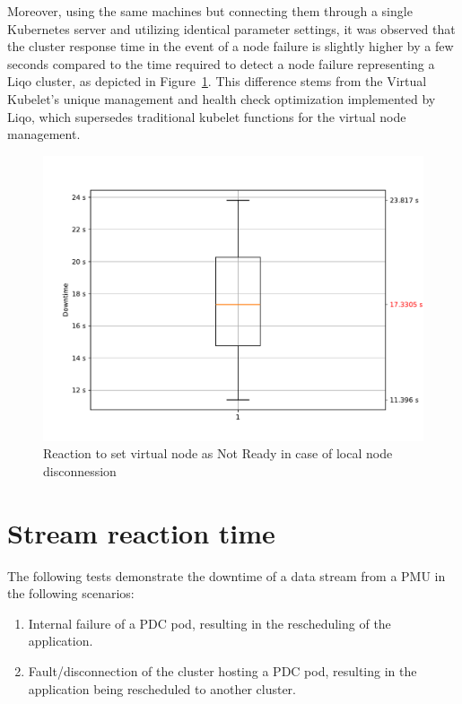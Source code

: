 Moreover, using the same machines but connecting them through a single Kubernetes server and utilizing identical parameter settings, it was observed that the cluster response time in the event of a node failure is slightly higher by a few seconds compared to the time required to detect a node failure representing a Liqo cluster, as depicted in Figure~\ref{graph:k-reaction2}. This difference stems from the Virtual Kubelet's unique management and health check optimization implemented by Liqo, which supersedes traditional kubelet functions for the virtual node management.

\begin{figure}[ht]\centering
\includegraphics[scale=0.4]{Pictures/k3s-reaction2}
\caption{Reaction to set virtual node as Not Ready in case of local node disconnession}\label{graph:k-reaction2}
\end{figure}

\section{Stream reaction time}
The following tests demonstrate the downtime of a data stream from a PMU in the following scenarios:

\begin{enumerate}
\item Internal failure of a PDC pod, resulting in the rescheduling of the application. 
\item Fault/disconnection of the cluster hosting a PDC pod, resulting in the application being rescheduled to another cluster.
\end{enumerate}

